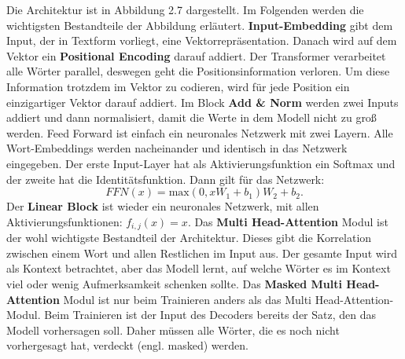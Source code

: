 \documentclass[12pt,letterpaper,ngerman]{article}
\begin{document}
Die Architektur ist in Abbildung 2.7 dargestellt. Im Folgenden werden 
die wichtigsten Bestandteile der Abbildung erläutert. {\bf Input-Embedding}
gibt dem Input, der in Textform vorliegt, eine Vektorrepräsentation.
Danach wird auf dem Vektor ein {\bf Positional Encoding} darauf addiert.
Der Transformer verarbeitet alle Wörter parallel, deswegen geht die 
Positionsinformation verloren. Um diese Information trotzdem im Vektor 
zu codieren, wird für jede Position ein einzigartiger Vektor darauf 
addiert. Im Block {\bf Add \& Norm} werden zwei Inputs addiert und dann 
normalisiert, damit die Werte in dem Modell nicht zu groß werden.
Feed Forward ist einfach ein neuronales Netzwerk mit zwei Layern.
Alle Wort-Embeddings werden nacheinander und identisch in das Netzwerk 
eingegeben. Der erste Input-Layer hat als Aktivierungsfunktion ein 
Softmax und der zweite hat die Identitätsfunktion.
Dann gilt für das Netzwerk:
\[
  FFN(x) =\text{max}(0, xW_1 + b_1)W_2 + b_2.
\]
Der {\bf Linear Block} ist wieder ein neuronales Netzwerk, mit allen
Aktivierungsfunktionen: $ f_{i,j}(x) = x $. 
Das {\bf Multi Head-Attention} Modul ist der wohl wichtigste Bestandteil der 
Architektur. Dieses gibt die Korrelation zwischen einem Wort und allen
Restlichen im Input aus. Der gesamte Input wird als Kontext betrachtet,
aber das Modell lernt, auf welche Wörter es im Kontext viel oder wenig
Aufmerksamkeit schenken sollte. Das {\bf Masked Multi Head-Attention}
Modul ist nur beim Trainieren anders als das Multi Head-Attention-Modul.
Beim Trainieren ist der Input des Decoders bereits der Satz,
den das Modell vorhersagen soll. Daher müssen alle Wörter, 
die es noch nicht vorhergesagt hat, verdeckt (engl. masked) werden.
\end{document}
